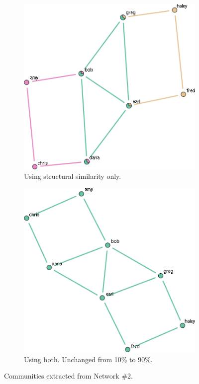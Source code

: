\documentclass{report} %
\begin{document}
\begin{figure}[htp!]
  \centering
  \begin{subfigure}{.5\textwidth}
    \centering
    \includegraphics[width=.8\linewidth]{toy3/no_ea/edge_comm.png}
    \caption{Using structural similarity only.}
    \label{fig:net2_comm_struct}
  \end{subfigure}%
  \begin{subfigure}{.5\textwidth}
    \centering
    \includegraphics[width=.9\linewidth]{toy3/ea/edge_comm_0.25.png}
    \caption{Using both. Unchanged from 10\% to 90\%.}
    \label{fig:net2_comm_both}
  \end{subfigure}
  \caption{Communities extracted from Network \#2.}
  \label{fig:net2_comm}
\end{figure}
\end{document}
